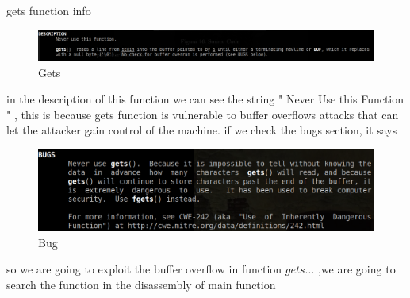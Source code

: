 \documentclass[10pt,a4paper]{article} %
\begin{document}
            \newpage
            gets function info
            \begin{figure}[h!]
                \centering
                \includegraphics[width=0.5\linewidth]{gets.png}
                \caption{Gets}
                \label{fig:gets}
            \end{figure}

            in the description of this function we can see the string " Never
            Use this Function  " , this is because gets function is vulnerable
            to buffer overflows attacks that can let the attacker gain control
            of the machine.
            if we check the bugs section, it says
            \begin{figure}[h!]
                \centering
                \includegraphics[width=0.4\linewidth]{bug.png}
                \caption{Bug}
                \label{fig:bug}
            \end{figure}
            so we are going to exploit the buffer overflow in function $
            gets...  $ ,we are going to search the function in the disassembly
            of main function
\end{document}
